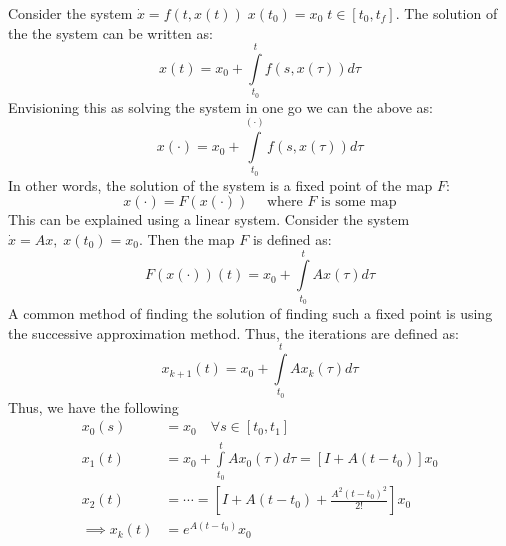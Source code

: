 Consider the system \(\dot{x} = f(t,x(t)) \; x(t_0) = x_0 \; t \in [t_0, t_f]\). The solution of the
the system can be written as:
\[
    x(t) = x_0 + \int\limits_{t_0}^{t} f(s, x(\tau )) d\tau
\]
Envisioning this as solving the system in one go we can the above as:
\[
    x(\cdot) = x_0 + \int\limits_{t_0}^{(\cdot)} f(s, x(\tau )) d\tau
\]
In other words, the solution of the system is a fixed point of the map \(F\): 
\[
    x(\cdot) = F(x(\cdot)) \quad \text{ where }F \text{ is some map}  
\]
This can be explained using a linear system. Consider the system \(\dot{x} = Ax, \; x(t_0) = x_0\).
Then the map \(F\) is defined as:
\[
    F(x(\cdot))(t) = x_0 + \int\limits_{t_0}^{t} A x(\tau) d\tau
\]
A common method of finding the solution of finding such a fixed point is using the successive
approximation method. Thus, the iterations are defined as:
\[
    x_{k+1}(t) = x_0 + \int\limits_{t_0}^{t} A x_k(\tau) d\tau
\]
Thus, we have the following
\[
    \begin{aligned}
        x_0(s) &= x_0 \quad \forall s \in [t_0, t_1] \\
        x_1(t) &= x_0 + \int\limits_{t_0}^{t} A x_0(\tau) d\tau = \left[ I + A(t-t_0) \right] x_0\\
        x_2(t) &= \cdots  = \left[ I + A(t-t_0) + \frac{A^2(t-t_0)^2}{2!} \right] x_0 \\
        \implies x_k(t) &= e^{A(t-t_0)} x_0
    \end{aligned}
\]

